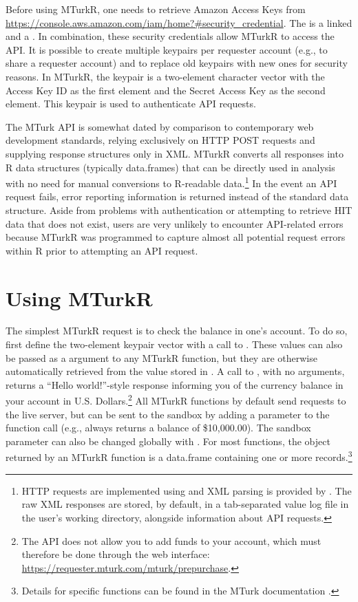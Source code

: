 Before using MTurkR, one needs to retrieve Amazon Access Keys from \url{https://console.aws.amazon.com/iam/home?#security_credential}. The  is a linked  and a . In combination, these security credentials allow MTurkR to access the API. It is possible to create multiple keypairs per requester account (e.g., to share a requester account) and to replace old keypairs with new ones for security reasons. In MTurkR, the keypair is a two-element character vector with the Access Key ID as the first element and the Secret Access Key as the second element. This keypair is used to authenticate API requests.

The MTurk API is somewhat dated by comparison to contemporary web development standards, relying exclusively on HTTP POST requests and supplying response structures only in XML. MTurkR converts all responses into R data structures (typically data.frames) that can be directly used in analysis with no need for manual conversions to R-readable data.\footnote{HTTP requests are implemented using  \citep{Ooms2015} and XML parsing is provided by  \citep{TempleLang2012b}. The raw XML responses are stored, by default, in a tab-separated value log file in the user's working directory, alongside information about API requests.} In the event an API request fails, error reporting information is returned instead of the standard data structure. Aside from problems with authentication or attempting to retrieve HIT data that does not exist, users are very unlikely to encounter API-related errors because MTurkR was programmed to capture almost all potential request errors within R prior to attempting an API request.

\section{Using MTurkR}
The simplest MTurkR request is to check the balance in one's account. To do so, first define the two-element keypair vector with a call to . These values can also be passed as a  argument to any MTurkR function, but they are otherwise automatically retrieved from the value stored in . A call to , with no arguments, returns a ``Hello world!''-style response informing you of the currency balance in your account in U.S. Dollars.\footnote{The API does not allow you to add funds to your account, which must therefore be done through the web interface: \url{https://requester.mturk.com/mturk/prepurchase}.} All MTurkR functions by default send requests to the live server, but can be sent to the sandbox by adding a  parameter to the function call (e.g.,  always returns a balance of \$10,000.00). The sandbox parameter can also be changed globally with . For most functions, the object returned by an MTurkR function is a data.frame containing one or more records.\footnote{Details for specific functions can be found in the MTurk documentation \citep{Leeper2012c}.}

